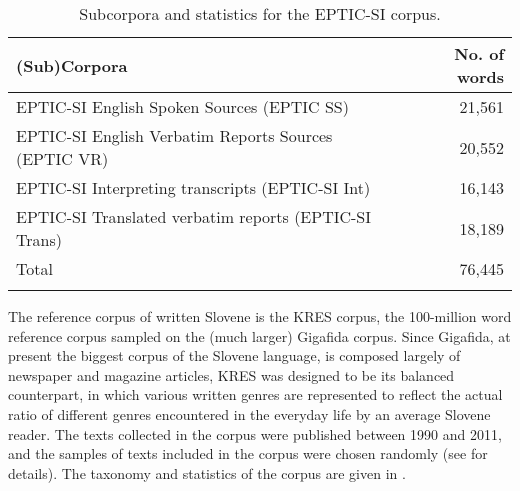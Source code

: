 \documentclass[output=paper]{langscibook}
\begin{document}
\begin{table}
\begin{tabular}{lr}
\lsptoprule
{(Sub)Corpora} & {No. of words}\\
\midrule
EPTIC-SI English Spoken Sources (EPTIC SS) & 21,561\\
EPTIC-SI English Verbatim Reports Sources (EPTIC VR) & 20,552\\
EPTIC-SI Interpreting transcripts (EPTIC-SI Int) & 16,143\\
EPTIC-SI Translated verbatim reports (EPTIC-SI Trans) & 18,189\\
\midrule
Total & 76,445\\
\lspbottomrule
\end{tabular}
\caption{Subcorpora and statistics for the EPTIC-SI corpus.\label{tab:mikolic:1}}
\end{table}

The reference corpus of written Slovene is the KRES corpus, the 100-million word reference corpus sampled on the (much larger) Gigafida corpus. Since Gigafida, at present the biggest corpus of the Slovene language, is composed largely of newspaper and magazine articles, KRES was designed to be its balanced counterpart, in which various written genres are represented to reflect the actual ratio of different genres encountered in the everyday life by an average Slovene reader. The texts collected in the corpus were published between 1990 and 2011, and the samples of texts included in the corpus were chosen randomly (see \citealt{LogarBergincEtAl2012} for details). The taxonomy and statistics of the corpus are given in .
\end{document}
